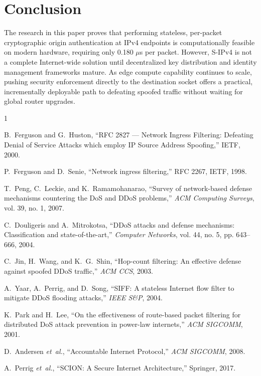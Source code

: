 \documentclass[journal]{IEEEtran}
\begin{document}
\section{Conclusion}
\label{sec:conclusion}
The research in this paper proves that performing stateless, per-packet cryptographic origin authentication at IPv4 endpoints is computationally feasible on modern hardware, requiring only 0.180 $\mu$s per packet. However, S-IPv4 is not a complete Internet-wide solution until decentralized key distribution and identity management frameworks mature. As edge compute capability continues to scale, pushing security enforcement directly to the destination socket offers a practical, incrementally deployable path to defeating spoofed traffic without waiting for global router upgrades.

\balance
\begin{thebibliography}{1}

B.~Ferguson and G.~Huston, ``RFC 2827 --- Network Ingress Filtering: Defeating Denial of Service Attacks which employ IP Source Address Spoofing,'' IETF, 2000.

P.~Ferguson and D.~Senie, ``Network ingress filtering,'' RFC 2267, IETF, 1998.

T.~Peng, C.~Leckie, and K.~Ramamohanarao, ``Survey of network-based defense mechanisms countering the DoS and DDoS problems,'' \emph{ACM Computing Surveys}, vol. 39, no. 1, 2007.

C.~Douligeris and A.~Mitrokotsa, ``DDoS attacks and defense mechanisms: Classification and state-of-the-art,'' \emph{Computer Networks}, vol. 44, no. 5, pp. 643--666, 2004.

C.~Jin, H.~Wang, and K.~G.~Shin, ``Hop-count filtering: An effective defense against spoofed DDoS traffic,'' \emph{ACM CCS}, 2003.

A.~Yaar, A.~Perrig, and D.~Song, ``SIFF: A stateless Internet flow filter to mitigate DDoS flooding attacks,'' \emph{IEEE S\&P}, 2004.

K.~Park and H.~Lee, ``On the effectiveness of route-based packet filtering for distributed DoS attack prevention in power-law internets,'' \emph{ACM SIGCOMM}, 2001.

D.~Andersen \emph{et~al.}, ``Accountable Internet Protocol,'' \emph{ACM SIGCOMM}, 2008.

A.~Perrig \emph{et~al.}, ``SCION: A Secure Internet Architecture,'' Springer, 2017.


\end{thebibliography}
\end{document}
